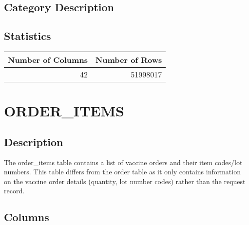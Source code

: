 \documentclass[
  letterpaper,
  DIV=11,
  numbers=noendperiod]{scrreprt}
\begin{document}
\hypertarget{category-description-20}{%
\section*{Category Description}\label{category-description-20}}

\hypertarget{statistics-20}{%
\section*{Statistics}\label{statistics-20}}

\begin{longtable}{rr}
\toprule
Number of Columns & Number of Rows \\ 
\midrule
42 & 51998017 \\ 
\bottomrule
\end{longtable}

\hypertarget{order_items}{%
\chapter*{ORDER\_ITEMS}\label{order_items}}

\hypertarget{description-21}{%
\section*{Description}\label{description-21}}

The order\_items table contains a list of vaccine orders and their item
codes/lot numbers. This table differs from the order table as it only
contains information on the vaccine order details (quantity, lot number
codes) rather than the request record.

\hypertarget{columns-21}{%
\section*{Columns}\label{columns-21}}
\end{document}
